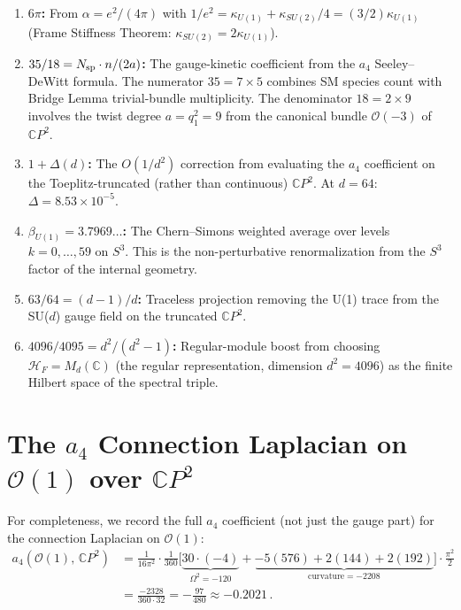\documentclass[12pt,a4paper]{article}
\theoremstyle{definition}
\begin{document}
\begin{enumerate}
\item \textbf{$6\pi$:} From $\alpha = e^2/(4\pi)$ with
  $1/e^2 = \kappa_{U(1)} + \kappa_{SU(2)}/4 = (3/2)\kappa_{U(1)}$
  (Frame Stiffness Theorem: $\kappa_{SU(2)} = 2\kappa_{U(1)}$).

\item \textbf{$35/18 = N_{\rm sp} \cdot n/(2a)$:} The gauge-kinetic
  coefficient from the $a_4$ Seeley--DeWitt formula.  The numerator
  $35 = 7 \times 5$ combines SM species count with Bridge Lemma
  trivial-bundle multiplicity.  The denominator $18 = 2 \times 9$
  involves the twist degree $a = q_1^2 = 9$ from the canonical bundle
  $\mathcal{O}(-3)$ of $\mathbb{C}P^2$.

\item \textbf{$1 + \Delta(d)$:} The $O(1/d^2)$ correction from evaluating
  the $a_4$ coefficient on the Toeplitz-truncated (rather than continuous)
  $\mathbb{C}P^2$.  At $d = 64$: $\Delta = 8.53 \times 10^{-5}$.

\item \textbf{$\beta_{U(1)} = 3.7969\ldots$:} The Chern--Simons weighted
  average over levels $k = 0, \ldots, 59$ on $S^3$.  This is the
  non-perturbative renormalization from the $S^3$ factor of the
  internal geometry.

\item \textbf{$63/64 = (d{-}1)/d$:} Traceless projection removing the
  U(1) trace from the SU($d$) gauge field on the truncated $\mathbb{C}P^2$.

\item \textbf{$4096/4095 = d^2/(d^2{-}1)$:} Regular-module boost from
  choosing $\mathcal{H}_F = M_d(\mathbb{C})$ (the regular representation,
  dimension $d^2 = 4096$) as the finite Hilbert space of the spectral triple.
\end{enumerate}

\section{The $a_4$ Connection Laplacian on $\mathcal{O}(1)$ over $\mathbb{C}P^2$}
\label{sec:a4-O1}

For completeness, we record the full $a_4$ coefficient (not just the gauge part)
for the connection Laplacian on $\mathcal{O}(1)$:
\begin{align}
a_4(\mathcal{O}(1),\,\mathbb{C}P^2)
&= \frac{1}{16\pi^2}\cdot\frac{1}{360}
\bigl[\underbrace{30 \cdot (-4)}_{\Omega^2 = -120}
+ \underbrace{-5(576) + 2(144) + 2(192)}_{\text{curvature} = -2208}\bigr]
\cdot\frac{\pi^2}{2} \nonumber\\[4pt]
&= \frac{-2328}{360 \cdot 32} = -\frac{97}{480}
\approx -0.2021\,.
\end{align}
\end{document}
